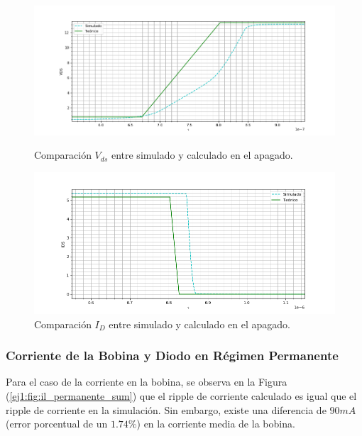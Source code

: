 \begin{figure}
	\centering
	\begin{minipage}{0.5\textwidth}
		\centering
		\includegraphics[width=1.1\textwidth]{ImagenesEjercicio-1/sim_apagado_drain} %
		\caption{Comparación $V_{ds}$ entre simulado y calculado en el apagado.}
		\label{ej1:fig:sim_apagado_drain}
	\end{minipage}\hfill
	\begin{minipage}{0.5\textwidth}
		\centering
		\includegraphics[width=1.1\textwidth]{ImagenesEjercicio-1/sim_apagado_drain_i} %
		\caption{Comparación $I_{D}$ entre simulado y calculado en el apagado.}
		\label{ej1:fig:sim_apagado_drain_i}
	\end{minipage}
\end{figure}

\subsubsection{Corriente de la Bobina y Diodo en Régimen Permanente}

Para el caso de la corriente en la bobina, se observa en la Figura (\ref{ej1:fig:il_permanente_sum}) que el ripple de corriente calculado es igual que el ripple de corriente en la simulación. Sin embargo, existe una diferencia de $90mA$ (error porcentual de un $1.74\%$) en la corriente media de la bobina.

